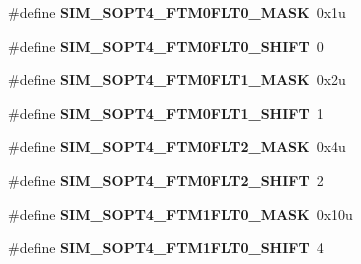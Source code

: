 \begin{DoxyCompactItemize}
\item 
\#define {\bfseries S\+I\+M\+\_\+\+S\+O\+P\+T4\+\_\+\+F\+T\+M0\+F\+L\+T0\+\_\+\+M\+A\+SK}~0x1u\hypertarget{group__SIM__Register__Masks_gaa868cd9e56dc4f0280f6d1866da1ac57}{}\label{group__SIM__Register__Masks_gaa868cd9e56dc4f0280f6d1866da1ac57}

\item 
\#define {\bfseries S\+I\+M\+\_\+\+S\+O\+P\+T4\+\_\+\+F\+T\+M0\+F\+L\+T0\+\_\+\+S\+H\+I\+FT}~0\hypertarget{group__SIM__Register__Masks_gafc9e6a78afb92b0ff8189d6bc30c39ce}{}\label{group__SIM__Register__Masks_gafc9e6a78afb92b0ff8189d6bc30c39ce}

\item 
\#define {\bfseries S\+I\+M\+\_\+\+S\+O\+P\+T4\+\_\+\+F\+T\+M0\+F\+L\+T1\+\_\+\+M\+A\+SK}~0x2u\hypertarget{group__SIM__Register__Masks_gaa42586e5889050292d5e70bf2d1aea2d}{}\label{group__SIM__Register__Masks_gaa42586e5889050292d5e70bf2d1aea2d}

\item 
\#define {\bfseries S\+I\+M\+\_\+\+S\+O\+P\+T4\+\_\+\+F\+T\+M0\+F\+L\+T1\+\_\+\+S\+H\+I\+FT}~1\hypertarget{group__SIM__Register__Masks_gaf503fb0314431593f41ebe5fa4b83851}{}\label{group__SIM__Register__Masks_gaf503fb0314431593f41ebe5fa4b83851}

\item 
\#define {\bfseries S\+I\+M\+\_\+\+S\+O\+P\+T4\+\_\+\+F\+T\+M0\+F\+L\+T2\+\_\+\+M\+A\+SK}~0x4u\hypertarget{group__SIM__Register__Masks_gafa0c4deac7488857fd22e28602b612fb}{}\label{group__SIM__Register__Masks_gafa0c4deac7488857fd22e28602b612fb}

\item 
\#define {\bfseries S\+I\+M\+\_\+\+S\+O\+P\+T4\+\_\+\+F\+T\+M0\+F\+L\+T2\+\_\+\+S\+H\+I\+FT}~2\hypertarget{group__SIM__Register__Masks_gacca0c622cfa1e0c7e7214096c38c6557}{}\label{group__SIM__Register__Masks_gacca0c622cfa1e0c7e7214096c38c6557}

\item 
\#define {\bfseries S\+I\+M\+\_\+\+S\+O\+P\+T4\+\_\+\+F\+T\+M1\+F\+L\+T0\+\_\+\+M\+A\+SK}~0x10u\hypertarget{group__SIM__Register__Masks_ga605f729e3f4faddc18e957c077adf61a}{}\label{group__SIM__Register__Masks_ga605f729e3f4faddc18e957c077adf61a}

\item 
\#define {\bfseries S\+I\+M\+\_\+\+S\+O\+P\+T4\+\_\+\+F\+T\+M1\+F\+L\+T0\+\_\+\+S\+H\+I\+FT}~4\hypertarget{group__SIM__Register__Masks_ga9fb8861affd661f64719260a43a87ec6}{}\label{group__SIM__Register__Masks_ga9fb8861affd661f64719260a43a87ec6}


\end{DoxyCompactItemize}
